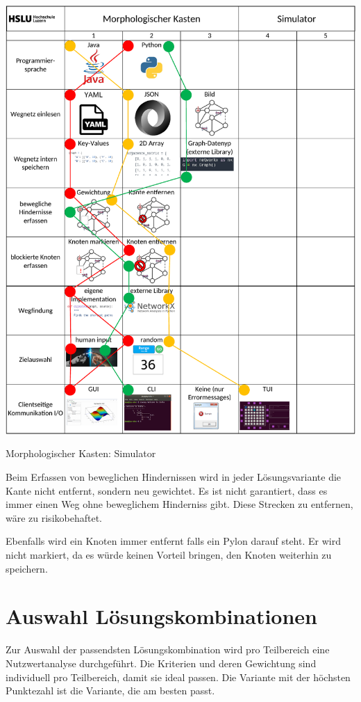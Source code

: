 \begin{table}[H]
\centering
\includegraphics[width=\textwidth]{assets/MK_Simulator.pdf}
\caption{Morphologischer Kasten: Simulator}
\label{table:mk-simulator}
\end{table}



Beim Erfassen von beweglichen Hindernissen wird in jeder Lösungsvariante die Kante nicht entfernt, sondern neu gewichtet. Es ist nicht garantiert, dass es immer einen Weg ohne beweglichem Hinderniss gibt. Diese Strecken zu entfernen, wäre zu risikobehaftet.

Ebenfalls wird ein Knoten immer entfernt falls ein Pylon darauf steht. Er wird nicht markiert, da es würde keinen Vorteil bringen, den Knoten weiterhin zu speichern.


\newpage
\section{Auswahl Lösungskombinationen}

Zur Auswahl der passendsten Lösungskombination wird pro Teilbereich eine Nutzwertanalyse durchgeführt. Die Kriterien und deren Gewichtung sind individuell pro Teilbereich, damit sie ideal passen. Die Variante mit der höchsten Punktezahl ist die Variante, die am besten passt.

